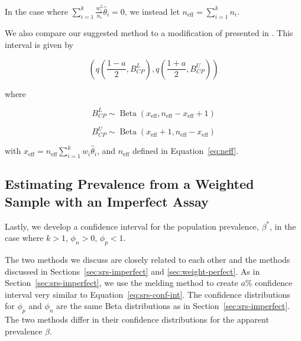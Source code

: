 \documentclass[AMA,STIX1COL]{WileyNJD-v2}
\begin{document}
In the case where \( \sum_{i=1}^k \frac{w_i^2}{n_i}\hat{\theta}_i = 0 \), we instead let \( n_{\text{eff}} = \sum_{i=1}^k n_i \).

We also compare our suggested method to a modification of \cite{Korn:1998} presented in \cite{Dean:2015}.
This interval is given by 

\begin{equation}
    \left( q \left( \frac{1 - a}{2}, B^L_{CP} \right), q \left( \frac{1 + a}{2}, B^U_{CP} \right)  \right)
\end{equation}

where 

\begin{equation}
    B^L_{CP} \sim \operatorname{Beta}\left(x_{\text{eff}},  n_{\text{eff}} -  x_{\text{eff}} + 1 \right)
\end{equation}

\begin{equation}
    B^U_{CP} \sim \operatorname{Beta}\left(x_{\text{eff}} + 1, n_{\text{eff}} - x_{\text{eff}} \right)
\end{equation}

with \( x_{\text{eff}} = n_{\text{eff}} \sum_{i=1}^k w_i \hat{\theta}_i \), and \( n_{\text{eff}} \) defined in Equation~\ref{eq:neff}.

\subsection{Estimating Prevalence from a Weighted Sample with an  Imperfect Assay}

Lastly, we develop a confidence interval for the population prevalence, \( \beta^* \), in the case where \( k > 1 \), \( \phi_n > 0 \), \( \phi_p < 1 \).

The two methods we discuss are closely related to each other and the methods discussed in Sections~\ref{sec:srs-imperfect} and \ref{sec:weight-perfect}.
As in Section~\ref{sec:srs-imperfect}, we use the melding method \cite{FayP:2015} to create \( a \)\% confidence interval very similar to Equation~\ref{eq:srs-conf-int}.
The confidence distributions for \( \phi_p \) and \( \phi_n \) are the same Beta distributions as in Section~\ref{sec:srs-imperfect}.
The two methods differ in their confidence distributions for the apparent prevalence \( \beta \).
\end{document}
